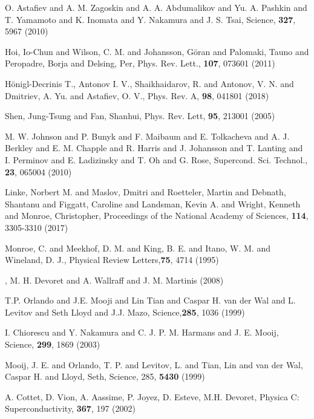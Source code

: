 \begin{thebibliography}{99}

O. Astafiev and A. M. Zagoskin and A. A. Abdumalikov and Yu. A. Pashkin and T. Yamamoto and K. Inomata and Y. Nakamura and J. S. Tsai, Science, \textbf{327}, 5967 (2010)

Hoi, Io-Chun and Wilson, C. M. and Johansson, G\"oran and Palomaki, Tauno and Peropadre, Borja and Delsing, Per, Phys. Rev. Lett., \textbf{107}, 073601 (2011)

H\"onigl-Decrinis T., Antonov I. V., Shaikhaidarov, R. and Antonov, V. N. and Dmitriev, A. Yu. and Astafiev, O. V., Phys. Rev. A, \textbf{98}, 041801 (2018)

Shen, Jung-Tsung and Fan, Shanhui, Phys. Rev. Lett, \textbf{95}, 213001 (2005)

{M. W. Johnson and P. Bunyk and F. Maibaum and E. Tolkacheva and A. J. Berkley and E. M. Chapple and R. Harris and J. Johansson and T. Lanting and I. Perminov and E. Ladizinsky and T. Oh and G. Rose}, {Supercond. Sci. Technol.}, \textbf{23}, {065004} (2010)
	
Linke, Norbert M. and Maslov, Dmitri and Roetteler, Martin and Debnath, Shantanu and Figgatt, Caroline and Landsman, Kevin A. and Wright, Kenneth and Monroe, Christopher, Proceedings of the National Academy of Sciences, \textbf{114}, 3305-3310 (2017)

{Monroe, C. and Meekhof, D. M. and King, B. E. and Itano, W. M. and Wineland, D. J.}, {Physical Review Letters},\textbf{75}, 4714 (1995)

, {M. H. Devoret and A. Wallraff and J. M. Martinis} (2008)

{T.P. Orlando and J.E. Mooji and Lin Tian and Caspar H. van der Wal and L. Levitov and Seth Lloyd and J.J. Mazo}, {Science},\textbf{285}, {1036} (1999)

{I. Chiorescu and Y. Nakamura and C. J. P. M. Harmans and J. E. Mooij}, {Science}, \textbf{299}, 1869 (2003)	

{Mooij, J. E. and Orlando, T. P. and Levitov, L. and Tian, Lin and van der Wal, Caspar H. and Lloyd, Seth}, {Science}, 285, \textbf{5430} (1999)
	
A. Cottet, D. Vion, A. Aassime, P. Joyez, D. Esteve, M.H. Devoret,
Physica C: Superconductivity, \textbf{367}, 197 (2002)


\end{thebibliography}
